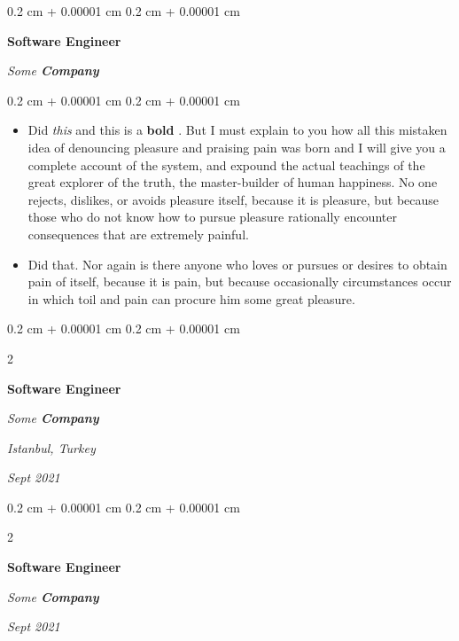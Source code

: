 \documentclass[10pt, letterpaper]{article}
\newenvironment{highlights}{
    \begin{itemize}[
        topsep=0.10 cm,
        parsep=0.10 cm,
        partopsep=0pt,
        itemsep=0pt,
        leftmargin=0.4 cm + 10pt
    ]
}{
    \end{itemize}
} %
\newenvironment{onecolentry}{
    \begin{adjustwidth}{
        0.2 cm + 0.00001 cm
    }{
        0.2 cm + 0.00001 cm
    }
}{
    \end{adjustwidth}
} %
\newenvironment{twocolentry}[2][]{
    \onecolentry
    \def\secondColumn{#2}
    \setcolumnwidth{\fill, 4.5 cm}
    \begin{paracol}{2}
}{
    \switchcolumn \raggedleft \secondColumn
    \end{paracol}
    \endonecolentry
} %
\let\hrefWithoutArrow\href
\renewcommand{\href}[2]{\hrefWithoutArrow{#1}{\ifthenelse{\equal{#2}{}}{ }{#2 }\raisebox{.15ex}{\footnotesize \faExternalLink*}}}
\begin{document}
        \vspace{0.2 cm}

        \begin{onecolentry}
            \textbf{Software Engineer}
            
            \textit{Some \textbf{Company}}
        \end{onecolentry}

        \vspace{0.10 cm}
        \begin{onecolentry}
            \begin{highlights}
                \item Did \textit{this} and this is a \textbf{bold} \href{https://example.com}{link}. But I must explain to you how all this mistaken idea of denouncing pleasure and praising pain was born and I will give you a complete account of the system, and expound the actual teachings of the great explorer of the truth, the master-builder of human happiness. No one rejects, dislikes, or avoids pleasure itself, because it is pleasure, but because those who do not know how to pursue pleasure rationally encounter consequences that are extremely painful.
                \item Did that. Nor again is there anyone who loves or pursues or desires to obtain pain of itself, because it is pain, but because occasionally circumstances occur in which toil and pain can procure him some great pleasure.
            \end{highlights}
        \end{onecolentry}


        \vspace{0.2 cm}

        \begin{twocolentry}{
        \textit{Istanbul, Turkey}    
            
        \textit{Sept 2021}}
            \textbf{Software Engineer}
            
            \textit{Some \textbf{Company}}
        \end{twocolentry}



        \vspace{0.2 cm}

        \begin{twocolentry}{
            
            
        \textit{Sept 2021}}
            \textbf{Software Engineer}
            
            \textit{Some \textbf{Company}}
        \end{twocolentry}
\end{document}

